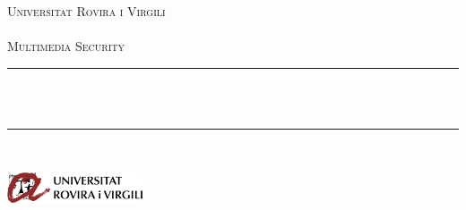 \begin{titlepage}
  	\newcommand{\HRule}{\rule{\linewidth}{0.3mm}} %
	\center %
	
	\textsc{\LARGE Universitat Rovira i Virgili}\\[1.5cm]
	
	\textsc{\Large \deliverableName}\\[0.5cm]
	
	\textsc{\large Multimedia Security}\\[0.5cm]
	
	
	\HRule\\[0.4cm]
	
	{\huge\bfseries \@title}\\[0.4cm]
	
	\HRule\\[1.5cm]
	

 	{\large\sc\@author} %
	
	
	\vfill\vfill
		{\large\@date} %
    \vfill\vfill\vfill
	
    
	
	\vfill
	\includegraphics[width=0.3\textwidth]{./urvlogo.png}
	\vfill
	 
	
\end{titlepage}
